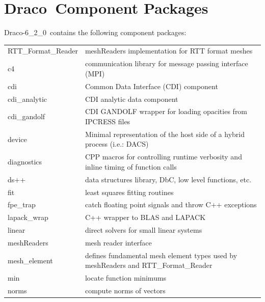 \documentclass[note]{ResearchNote_pdf}
\newcommand{\draco}{Draco}
\newcommand{\dracor}{\draco-6\_2\_0}
\newcommand{\tableText}[1]{{\raggedright #1}}
\begin{document}
\newpage
\section{\draco\ Component Packages}

\dracor\ contains the following component packages:
\begin{center}
  \footnotesize
  \begin{tabular}{lp{4.0in}}
    \hline\hline
    \textsf{RTT\_Format\_Reader} & \tableText{\textsf{meshReaders}
      implementation for RTT format meshes} \\
    \textsf{c4} & \tableText{communication library for message passing interface (MPI)} \\
    \textsf{cdi} & \tableText{Common Data Interface (CDI) component} \\
    \textsf{cdi\_analytic} & \tableText{CDI analytic data component} \\
    \textsf{cdi\_gandolf} & \tableText{CDI GANDOLF wrapper for loading
      opacities from IPCRESS files~\cite{gandolf,tops}} \\
    \textsf{device}         & \tableText{Minimal representation of the
      host side of a hybrid process (i.e.: DACS)} \\
    \textsf{diagnostics}  & \tableText{CPP macros for controlling runtime
      verbosity and inline timing of function calls} \\
    \textsf{ds++}         & \tableText{data structures library, DbC,
      low level functions, etc.} \\
    \textsf{fit}          & \tableText{least squares fitting routines} \\
    \textsf{fpe\_trap}    & \tableText{catch floating point signals and throw
      C++ exceptions} \\
    \textsf{lapack\_wrap} & \tableText{C++ wrapper to BLAS and LAPACK} \\
    \textsf{linear}       & \tableText{direct solvers for small linear systems} \\
    \textsf{meshReaders}  & \tableText{mesh reader interface} \\
    \textsf{mesh\_element} & \tableText{defines fundamental mesh element types
      used by \textsf{meshReaders} and \textsf{RTT\_Format\_Reader}} \\
    \textsf{min}          & \tableText{locate function minimums} \\
    \textsf{norms}        & \tableText{compute norms of vectors} \\

\end{tabular}
\end{center}
\end{document}

